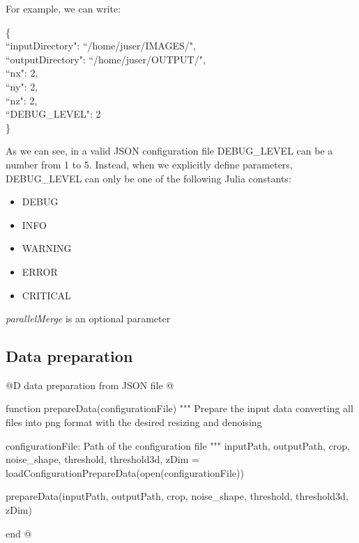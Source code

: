 \documentclass[11pt,oneside]{article}	%
\begin{document}
For example, we can write:

\begin{tabbing}
\{ \= \\
\>  ``inputDirectory": ``/home/juser/IMAGES/",\\
\>  ``outputDirectory": ``/home/juser/OUTPUT/",\\
\>  ``nx": 2,\\
\>  ``ny": 2,\\
\>  ``nz": 2,\\
\>  ``DEBUG\_LEVEL": 2\\
\}\\
\end{tabbing}

As we can see, in a valid JSON configuration file DEBUG\_LEVEL can be a number from 1 to 5. Instead, when we explicitly define parameters, DEBUG\_LEVEL can only be one of the following Julia constants:

\begin{itemize}
 \item DEBUG
 \item INFO
 \item WARNING
 \item ERROR
 \item CRITICAL
\end{itemize}

\textit{parallelMerge} is an optional parameter

\subsection{Data preparation}\label{sec:dataPreparation}

@D data preparation from JSON file
@{function prepareData(configurationFile)
  """
  Prepare the input data converting all files into png
  format with the desired resizing and denoising

  configurationFile: Path of the configuration file
  """
  inputPath, outputPath, crop,
	  noise_shape, threshold,
	  threshold3d, zDim = loadConfigurationPrepareData(open(configurationFile))

  prepareData(inputPath, outputPath, crop, noise_shape, 
	      threshold, threshold3d, zDim)
      
end
@}
\end{document}
